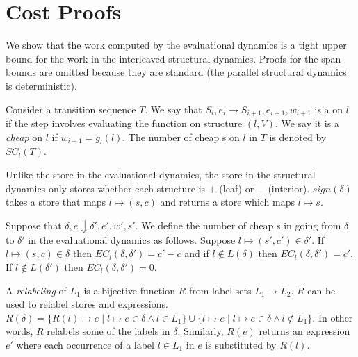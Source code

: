 \section{Cost Proofs}
\label{sec:costproof}

We show that the work computed by the evaluational dynamics is a tight upper bound for the work in the interleaved structural dynamics. Proofs for the span bounds are omitted because they are standard (the parallel structural dynamics is deterministic).

\begin{definition}
Consider a transition sequence $T$. We say that $S_i, e_i \to S_{i+1}, e_{i+1}, w_{i+1}$ is a \get{} on $l$ if the step involves evaluating the \get{} function on structure $(l, V)$. We say it is a \emph{cheap \get{}} on $l$ if $w_{i+1} = g_l(l)$. The number of cheap \get{}s on $l$ in $T$ is denoted by $SC_l(T)$.
\end{definition}

\begin{definition}
Unlike the store in the evaluational dynamics, the store in the structural dynamics only stores whether each structure is $+$ (leaf) or $-$ (interior). $sign(\delta)$ takes a store that maps $l \mapsto (s,c)$ and returns a store which maps $l \mapsto s$.
\end{definition}

\begin{definition}
Suppose that $\delta, e \Downarrow \delta', e', w', s'$. We define the number of cheap \get{}s in going from $\delta$ to $\delta'$ in the evaluational dynamics as follows. Suppose $l \mapsto (s', c') \in \delta'$. If $l \mapsto (s,c) \in \delta$ then $EC_l(\delta, \delta') = c' - c$ and if $l \not\in L(\delta)$ then $EC_l(\delta, \delta') = c'$. If $l \not\in L(\delta')$ then $EC_l(\delta, \delta') = 0$.
\end{definition}

\begin{definition}
A \emph{relabeling} of $L_1$ is a bijective function $R$ from label sets $L_1 \to L_2$. $R$ can be used to relabel stores and expressions. $R(\delta) = \{ R(l) \mapsto e \; | \; l \mapsto e \in \delta \wedge l \in L_1  \} \cup \{ l \mapsto e \; | \; l \mapsto e \in \delta \wedge l \not\in L_1  \}$. In other words, $R$ relabels some of the labels in $\delta$. Similarly, $R(e)$ returns an expression $e'$ where each occurrence of a label $l \in L_1$ in $e$ is substituted by $R(l)$.
\end{definition}


